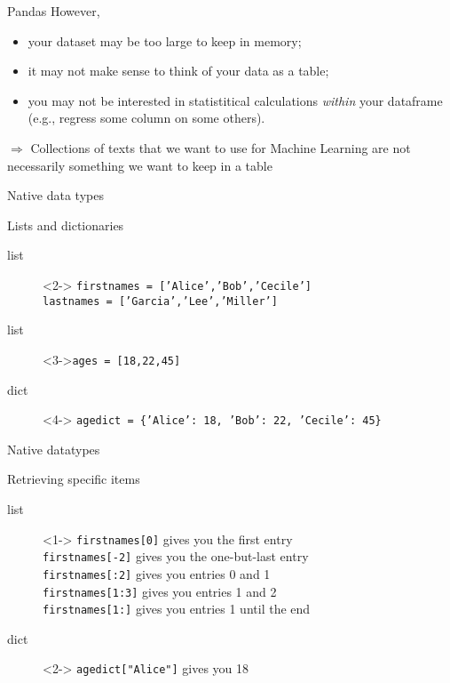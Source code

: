 \documentclass[compress]{beamer}
\begin{document}
\begin{frame}{Pandas}
However, 
\begin{itemize}[<+->]
	\item your dataset may be too large to keep in memory;
	\item it may not make sense to think of your data as a table;
	\item you may not be interested in statistitical calculations \emph{within} your dataframe (e.g., regress some column on some others).
\end{itemize}
\pause 
$\Rightarrow$ Collections of texts that we want to use for Machine Learning are not necessarily something we want to keep in a table
\end{frame}



\begin{frame}{Native data types}
	\begin{block}{Lists and dictionaries}
		\begin{description}
			\item[{\color{red}list}]<2-> \texttt{firstnames = ['Alice','Bob','Cecile'] \\
				 lastnames = ['Garcia','Lee','Miller']}
			\item[{\color{red}list}]<3->\texttt{ages = [18,22,45]}
			\item[{\color{red}dict}]<4-> \texttt{agedict = \{'Alice': 18, 'Bob': 22, 'Cecile': 45\} }
		\end{description}
	\end{block}
\end{frame}


\begin{frame}{Native datatypes}
	\begin{block}{Retrieving specific items}
		\begin{description}
			\item[{\color{red}list}]<1-> \texttt{firstnames[0]} gives you the first entry\\ 
				\texttt{firstnames[-2]} gives you the one-but-last entry\\
				\texttt{firstnames[:2]} gives you entries 0 and 1\\
				\texttt{firstnames[1:3]} gives you entries 1 and 2\\
				\texttt{firstnames[1:]} gives you entries 1 until the end\\
			\item[{\color{red}dict}]<2-> \texttt{agedict["Alice"]} gives you 18 
		\end{description}
	
	\end{block}
\end{frame}
\end{document}
